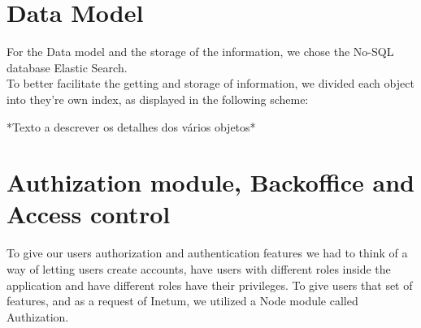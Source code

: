 \documentclass[a4paper,twoside,10pt]{report}
\begin{document}
\section{Data Model}
For the Data model and the storage of the information, we chose the No-SQL database Elastic Search.
\\ \newline
To better facilitate the getting and storage of information, we divided each object into they're own index, as displayed in the following scheme:
\begin{center}
\end{center}
*Texto a descrever os detalhes dos vários objetos*

\newpage
\section{Authization module, Backoffice and Access control}
 To give our users authorization and authentication features we had to think of a way of letting users create accounts, have users with different roles inside the application and have different roles have their privileges. To give users that set of features, and as a request of Inetum, we utilized a Node module called Authization. 
\end{document}
